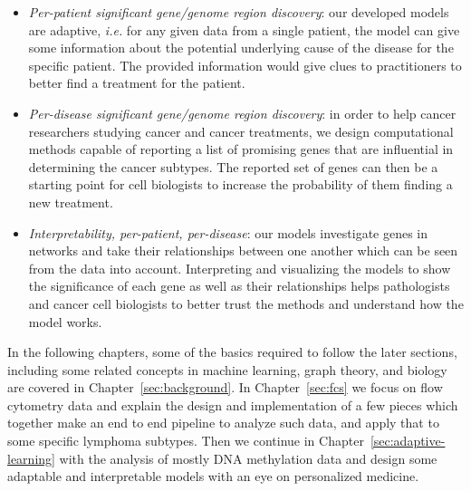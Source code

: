 \begin{itemize}
  \item \emph{Per-patient significant gene/genome region discovery}: our
    developed models are adaptive, \emph{i.e.} for any given data from a single
    patient, the model can give some information about the potential underlying
    cause of the disease for the specific patient. The provided information
    would give clues to practitioners to better find a treatment for the
    patient.
  \item \emph{Per-disease significant gene/genome region discovery}: in order
    to help cancer researchers studying cancer and cancer treatments, we design
    computational methods capable of reporting a list of promising genes that
    are influential in determining the cancer subtypes. The reported set of
    genes can then be a starting point for cell biologists to increase the
    probability of them finding a new treatment.
  \item \emph{Interpretability, per-patient, per-disease}: our models
    investigate genes in networks and take their relationships between one
    another which can be seen from the data into account. Interpreting and
    visualizing the models to show the significance of each gene as well as
    their relationships helps pathologists and cancer cell biologists to better
    trust the methods and understand how the model works.
\end{itemize}

In the following chapters, some of the basics required to follow the later
sections, including some related concepts in machine learning, graph theory,
and biology are covered in Chapter~\ref{sec:background}. In
Chapter~\ref{sec:fcs} we focus on flow cytometry data and explain the design
and implementation of a few pieces which together make an end to end pipeline
to analyze such data, and apply that to some specific lymphoma subtypes. Then
we continue in Chapter~\ref{sec:adaptive-learning} with the analysis of mostly
DNA methylation data and design some adaptable and interpretable models with an
eye on personalized medicine.
